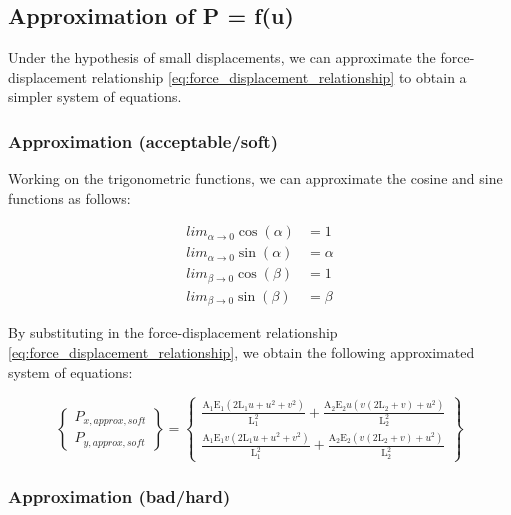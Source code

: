 \subsection{Approximation of P = f(u)}
\label{subsec:approximation}

Under the hypothesis of small displacements, we can approximate the force-displacement relationship \ref{eq:force_displacement_relationship} to obtain a simpler system of equations.


\subsubsection{Approximation (acceptable/soft)}

Working on the trigonometric functions, we can approximate the cosine and sine functions as follows:

\begin{align}
    lim_{\alpha \to 0} \cos(\alpha) & = 1      \\
    lim_{\alpha \to 0} \sin(\alpha) & = \alpha \\
    lim_{\beta \to 0} \cos(\beta)   & = 1      \\
    lim_{\beta \to 0} \sin(\beta)   & = \beta
    \label{eq:trigonometric_approximation_soft}
\end{align}

By substituting in the force-displacement relationship \ref{eq:force_displacement_relationship}, we obtain the following approximated system of equations:

\begin{equation}
    \begin{Bmatrix}
        P_{x,approx,soft} \\
        P_{y,approx,soft}
    \end{Bmatrix}
    =
    \begin{Bmatrix}
        \frac{\text{A}_1 \text{E}_1 \left(2 \text{L}_1 u+u^2+v^2\right)}{\text{L}_1^2}+\frac{\text{A}_2 \text{E}_2 u \left(v (2 \text{L}_2+v)+u^2\right)}{\text{L}_2^2} \\
        \frac{\text{A}_1 \text{E}_1 v \left(2 \text{L}_1 u+u^2+v^2\right)}{\text{L}_1^2}+\frac{\text{A}_2 \text{E}_2 \left(v (2 \text{L}_2+v)+u^2\right)}{\text{L}_2^2}
    \end{Bmatrix}
    \label{eq:force_displacement_relationship_approximation_soft}
\end{equation}


\subsubsection{Approximation (bad/hard)}

